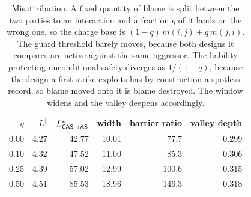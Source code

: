 \begin{table}[!ht]
\centering
\caption{Misattribution. A fixed quantity of blame is split between the two parties to an interaction and a fraction $q$ of it lands on the wrong one, so the charge base is $(1-q)\,m(i,j)+q\,m(j,i)$. The guard threshold barely moves, because both designs it compares are active against the same aggressor. The liability protecting unconditional safety diverges as $1/(1-q)$, because the design a first strike exploits has by construction a spotless record, so blame moved onto it is blame destroyed. The window widens and the valley deepens accordingly.}
\label{tab:attribution}
\begin{tabular}{rrrrrr}
\toprule
$q$ & $L^{\dagger}$ & $L^{*}_{\textsf{CAS}\to\textsf{AS}}$ & width & barrier ratio & valley depth \\
\midrule
0.00 & 4.27 & 42.77 & 10.01 & 77.7 & 0.299 \\
0.10 & 4.32 & 47.52 & 11.00 & 85.3 & 0.306 \\
0.25 & 4.39 & 57.02 & 12.99 & 100.6 & 0.315 \\
0.50 & 4.51 & 85.53 & 18.96 & 146.3 & 0.318 \\
\bottomrule
\end{tabular}
\end{table}
